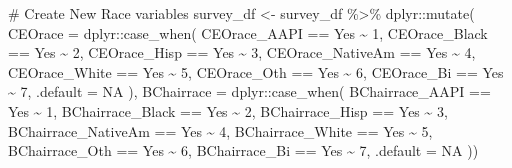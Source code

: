 \documentclass[
  letterpaper,
]{scrbook}
\newenvironment{Shaded}{\begin{snugshade}}{\end{snugshade}}
\newcommand{\AttributeTok}[1]{\textcolor[rgb]{0.40,0.45,0.13}{#1}}
\newcommand{\CommentTok}[1]{\textcolor[rgb]{0.37,0.37,0.37}{#1}}
\newcommand{\ConstantTok}[1]{\textcolor[rgb]{0.56,0.35,0.01}{#1}}
\newcommand{\DecValTok}[1]{\textcolor[rgb]{0.68,0.00,0.00}{#1}}
\newcommand{\FunctionTok}[1]{\textcolor[rgb]{0.28,0.35,0.67}{#1}}
\newcommand{\NormalTok}[1]{\textcolor[rgb]{0.00,0.23,0.31}{#1}}
\newcommand{\OtherTok}[1]{\textcolor[rgb]{0.00,0.23,0.31}{#1}}
\newcommand{\SpecialCharTok}[1]{\textcolor[rgb]{0.37,0.37,0.37}{#1}}
\newcommand{\StringTok}[1]{\textcolor[rgb]{0.13,0.47,0.30}{#1}}
\begin{document}
\begin{Shaded}
\begin{Highlighting}[]
\CommentTok{\# Create New Race variables}
\NormalTok{survey\_df }\OtherTok{\textless{}{-}}\NormalTok{ survey\_df }\SpecialCharTok{\%\textgreater{}\%}
\NormalTok{  dplyr}\SpecialCharTok{::}\FunctionTok{mutate}\NormalTok{(}
    \AttributeTok{CEOrace =}\NormalTok{ dplyr}\SpecialCharTok{::}\FunctionTok{case\_when}\NormalTok{(}
\NormalTok{      CEOrace\_AAPI }\SpecialCharTok{==} \StringTok{\textquotesingle{}Yes\textquotesingle{}} \SpecialCharTok{\textasciitilde{}} \DecValTok{1}\NormalTok{,}
\NormalTok{      CEOrace\_Black }\SpecialCharTok{==} \StringTok{\textquotesingle{}Yes\textquotesingle{}} \SpecialCharTok{\textasciitilde{}} \DecValTok{2}\NormalTok{,}
\NormalTok{      CEOrace\_Hisp }\SpecialCharTok{==} \StringTok{\textquotesingle{}Yes\textquotesingle{}} \SpecialCharTok{\textasciitilde{}} \DecValTok{3}\NormalTok{,}
\NormalTok{      CEOrace\_NativeAm }\SpecialCharTok{==} \StringTok{\textquotesingle{}Yes\textquotesingle{}} \SpecialCharTok{\textasciitilde{}} \DecValTok{4}\NormalTok{,}
\NormalTok{      CEOrace\_White }\SpecialCharTok{==} \StringTok{\textquotesingle{}Yes\textquotesingle{}} \SpecialCharTok{\textasciitilde{}} \DecValTok{5}\NormalTok{,}
\NormalTok{      CEOrace\_Oth }\SpecialCharTok{==} \StringTok{\textquotesingle{}Yes\textquotesingle{}} \SpecialCharTok{\textasciitilde{}} \DecValTok{6}\NormalTok{,}
\NormalTok{      CEOrace\_Bi }\SpecialCharTok{==} \StringTok{\textquotesingle{}Yes\textquotesingle{}} \SpecialCharTok{\textasciitilde{}} \DecValTok{7}\NormalTok{,}
      \AttributeTok{.default =} \ConstantTok{NA}
\NormalTok{    ),}
    \AttributeTok{BChairrace =}\NormalTok{ dplyr}\SpecialCharTok{::}\FunctionTok{case\_when}\NormalTok{(}
\NormalTok{      BChairrace\_AAPI }\SpecialCharTok{==} \StringTok{\textquotesingle{}Yes\textquotesingle{}} \SpecialCharTok{\textasciitilde{}} \DecValTok{1}\NormalTok{,}
\NormalTok{      BChairrace\_Black }\SpecialCharTok{==} \StringTok{\textquotesingle{}Yes\textquotesingle{}} \SpecialCharTok{\textasciitilde{}} \DecValTok{2}\NormalTok{,}
\NormalTok{      BChairrace\_Hisp }\SpecialCharTok{==} \StringTok{\textquotesingle{}Yes\textquotesingle{}} \SpecialCharTok{\textasciitilde{}} \DecValTok{3}\NormalTok{,}
\NormalTok{      BChairrace\_NativeAm }\SpecialCharTok{==} \StringTok{\textquotesingle{}Yes\textquotesingle{}} \SpecialCharTok{\textasciitilde{}} \DecValTok{4}\NormalTok{,}
\NormalTok{      BChairrace\_White }\SpecialCharTok{==} \StringTok{\textquotesingle{}Yes\textquotesingle{}} \SpecialCharTok{\textasciitilde{}} \DecValTok{5}\NormalTok{,}
\NormalTok{      BChairrace\_Oth }\SpecialCharTok{==} \StringTok{\textquotesingle{}Yes\textquotesingle{}} \SpecialCharTok{\textasciitilde{}} \DecValTok{6}\NormalTok{,}
\NormalTok{      BChairrace\_Bi }\SpecialCharTok{==} \StringTok{\textquotesingle{}Yes\textquotesingle{}} \SpecialCharTok{\textasciitilde{}} \DecValTok{7}\NormalTok{,}
      \AttributeTok{.default =} \ConstantTok{NA}
\NormalTok{  ))}


\end{Highlighting}
\end{Shaded}
\end{document}
